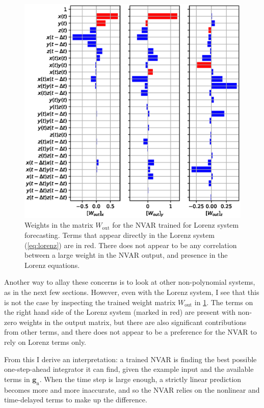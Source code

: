 \begin{figure}
  \includegraphics[width=\textwidth]{figures/nvar-predict-lorenz-wout}
  \caption{Weights in the matrix $W_\text{out}$ for the NVAR trained
    for Lorenz system forecasting. Terms that appear directly in the
    Lorenz system (\cref{eq:lorenz}) are in red. There does not appear
    to be any correlation between a large weight in the NVAR output,
    and presence in the Lorenz equations.}
  \label{fig:nvar-predict-lorenz-wout}
\end{figure}

Another way to allay these concerns is to look at other non-polynomial
systems, as in the next few sections. However, even with the Lorenz
system, I see that this is not the case by inspecting the trained
weight matrix $W_\text{out}$ in
\cref{fig:nvar-predict-lorenz-wout}. The terms on the right hand side
of the Lorenz system (marked in red) are present with non-zero weights
in the output matrix, but there are also significant contributions
from other terms, and there does not appear to be a preference for the
NVAR to rely on Lorenz terms only.

From this I derive an interpretation: a trained NVAR is finding the
best possible one-step-ahead integrator it can find, given the example
input and the available terms in $\bm{g}_\text{n}$. When the time step
is large enough, a strictly linear prediction becomes more and more
inaccurate, and so the NVAR relies on the nonlinear and time-delayed
terms to make up the difference.

